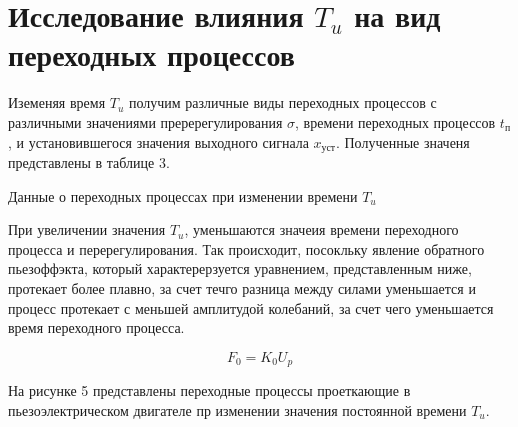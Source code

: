 \documentclass[a4paper, 12pt]{article}
\begin{document}
\newpage
\section{Исследование влияния $T_u$ на вид переходных процессов}
Иземеняя время $T_u$ получим различные виды переходных процессов с различными значениями преререгулирования $\sigma$, времени переходных процессов $t_\text{п}$, и установившегося значения выходного сигнала $x_\text{уст}$. Полученные значеня представлены в таблице 3.
\begin{table}[h!]
    \centering
    \begin{threeparttable}
        \caption{Данные о переходных процессах при изменении времени $T_u$}
    \end{threeparttable}
\end{table} \par
При увеличении значения $T_u$, уменьшаются значеия времени переходного процесса и перерегулирования. Так происходит, посокльку явление обратного пьезоффэкта, который характерерзуется уравнением, представленным ниже, протекает более плавно, за счет течго разница между силами уменьшается и процесс протекает с меньшей амплитудой колебаний, за счет чего уменьшается время переходного процесса. \par
\begin{equation*}
    F_0 = K_0U_p
\end{equation*} \par
На рисунке 5 представлены переходные процессы проеткающие в пьезоэлектрическом двигателе пр изменении значения постоянной времени $T_u$.
\end{document}
